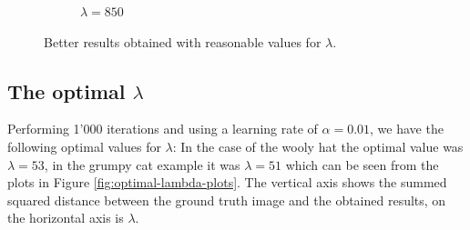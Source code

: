 \documentclass{paper}
\begin{document}
\begin{figure}[ht]
\begin{subfigure}[h]{0.3\textwidth}
    \caption*{$\lambda = 850$}
 \end{subfigure}
 \caption{Better results obtained with reasonable values for $\lambda$.}
 \label{fig:lambda-reasonable}
\end{figure}

\subsection*{The optimal $\lambda$}
Performing 1'000 iterations and using a learning rate of $\alpha = 0.01$, we have the following optimal values for $\lambda$: In the case of the wooly hat the optimal value was $\lambda = 53$, in the grumpy cat example it was $\lambda = 51$ which can be seen from the plots in Figure \ref{fig:optimal-lambda-plots}. The vertical axis shows the summed squared distance between the ground truth image and the obtained results, on the horizontal axis is $\lambda$.
\end{document}

